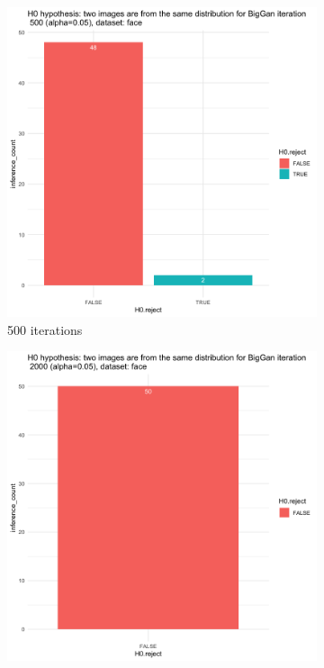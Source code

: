 \documentclass{article}
\begin{document}
\begin{figure}[h!]
    \caption{Dataset Face}
     \centering
     \begin{subfigure}[b]{0.3\textwidth}
         \centering
         \includegraphics[width=\textwidth]{kmmd_figures/biggan_face_500.png}
         \caption{500 iterations}
     \end{subfigure}
     \hfill
     \begin{subfigure}[b]{0.3\textwidth}
         \centering
         \includegraphics[width=\textwidth]{kmmd_figures/biggan_face_2000.png}

\end{subfigure}
\end{figure}
\end{document}
